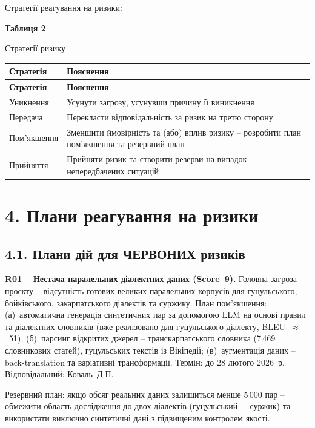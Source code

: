 \documentclass[14pt]{extarticle}
\begin{document}
\medskip

Стратегії реагування на ризики:

\medskip

\noindent\textbf{Таблиця 2}

\noindent Стратегії ризику

\begin{longtable}{|p{}|p{}|}
\hline
\textbf{Стратегія} & \textbf{Пояснення} \\
\hline
\endfirsthead
\hline
\textbf{Стратегія} & \textbf{Пояснення} \\
\hline
\endhead
Уникнення & Усунути загрозу, усунувши причину її виникнення \\
\hline
Передача & Перекласти відповідальність за ризик на третю сторону \\
\hline
Пом'якшення & Зменшити ймовірність та (або) вплив ризику -- розробити план пом'якшення та резервний план \\
\hline
Прийняття & Прийняти ризик та створити резерви на випадок непередбачених ситуацій \\
\hline
\end{longtable}

\section*{4. Плани реагування на ризики}

\subsection*{4.1. Плани дій для ЧЕРВОНИХ ризиків}

\textbf{R01 -- Нестача паралельних діалектних даних (Score~9).}
Головна загроза проєкту -- відсутність готових великих паралельних корпусів для гуцульського, бойківського, закарпатського діалектів та суржику. План пом'якшення: (а)~автоматична генерація синтетичних пар за допомогою LLM на основі правил та діалектних словників (вже реалізовано для гуцульського діалекту, BLEU~$\approx$~51); (б)~парсинг відкритих джерел -- транскарпатського словника (7\,469 словникових статей), гуцульських текстів із Вікіпедії; (в)~аугментація даних -- back-translation та варіативні трансформації. Термін: до 28 лютого 2026~р. Відповідальний: Коваль~Д.П.

Резервний план: якщо обсяг реальних даних залишиться менше 5\,000 пар -- обмежити область дослідження до двох діалектів (гуцульський + суржик) та використати виключно синтетичні дані з підвищеним контролем якості.
\end{document}
